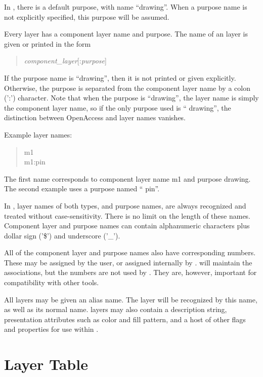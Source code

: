 In {\Xic}, there is a default purpose, with name ``{\vt drawing}''. 
When a purpose name is not explicitly specified, this purpose will be
assumed.

Every {\Xic} layer has a component layer name and purpose.  The name
of an {\Xic} layer is given or printed in the form
\begin{quote}
{\it component\_layer\/}[{\vt :}{\it purpose\/}]
\end{quote}
If the purpose name is ``{\vt drawing}'', then it is not printed or
given explicitly.  Otherwise, the purpose is separated from the
component layer name by a colon ('{\vt :}') character.  Note that when
the purpose is ``{\vt drawing}'', the {\Xic} layer name is simply the
component layer name, so if the only purpose used is ``{\vt
drawing}'', the distinction between OpenAccess and {\Xic} layer names
vanishes.

Example {\Xic} layer names:
\begin{quote}\vt
m1\\
m1:pin
\end{quote}
The first name corresponds to component layer name {\vt m1} and
purpose {\vt drawing}.  The second example uses a purpose named ``{\vt
pin}''.

In {\Xic}, layer names of both types, and purpose names, are always
recognized and treated without case-sensitivity.  There is no limit on
the length of these names.  Component layer and purpose names can
contain alphanumeric characters plus dollar sign ('{\vt \$}') and
underscore ('{\vt \_}').

All of the component layer and purpose names also have corresponding
numbers.  These may be assigned by the user, or assigned internally by
{\Xic}.  {\Xic} will maintain the associations, but the numbers are
not used by {\Xic}.  They are, however, important for compatibility
with other tools.

All {\Xic} layers may be given an alias name.  The layer will be
recognized by this name, as well as its normal name.  {\Xic} layers
may also contain a description string, presentation attributes such as
color and fill pattern, and a host of other flags and properties for
use within {\Xic}.


\section{Layer Table}

